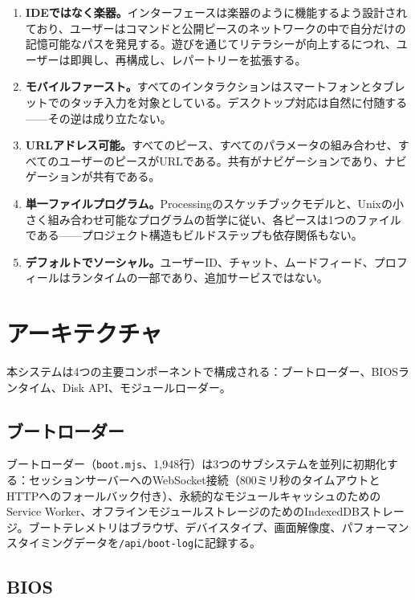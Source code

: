 \documentclass[10pt,letterpaper,twocolumn]{article}
\begin{document}
\begin{enumerate}
  \item \textbf{IDEではなく楽器。}インターフェースは楽器のように機能するよう設計されており、ユーザーはコマンドと公開ピースのネットワークの中で自分だけの記憶可能なパスを発見する。遊びを通じてリテラシーが向上するにつれ、ユーザーは即興し、再構成し、レパートリーを拡張する。
  \item \textbf{モバイルファースト。}すべてのインタラクションはスマートフォンとタブレットでのタッチ入力を対象としている。デスクトップ対応は自然に付随する——その逆は成り立たない。
  \item \textbf{URLアドレス可能。}すべてのピース、すべてのパラメータの組み合わせ、すべてのユーザーのピースがURLである。共有がナビゲーションであり、ナビゲーションが共有である。
  \item \textbf{単一ファイルプログラム。}Processingのスケッチブックモデルと、Unixの小さく組み合わせ可能なプログラムの哲学に従い、各ピースは1つのファイルである——プロジェクト構造もビルドステップも依存関係もない。
  \item \textbf{デフォルトでソーシャル。}ユーザーID、チャット、ムードフィード、プロフィールはランタイムの一部であり、追加サービスではない。
\end{enumerate}


\section{アーキテクチャ}
\label{sec:architecture}

本システムは4つの主要コンポーネントで構成される：ブートローダー、BIOSランタイム、Disk API、モジュールローダー。

\subsection{ブートローダー}

ブートローダー（\texttt{boot.mjs}、1,948行）は3つのサブシステムを並列に初期化する：セッションサーバーへのWebSocket接続（800ミリ秒のタイムアウトとHTTPへのフォールバック付き）、永続的なモジュールキャッシュのためのService Worker、オフラインモジュールストレージのためのIndexedDBストレージ。ブートテレメトリはブラウザ、デバイスタイプ、画面解像度、パフォーマンスタイミングデータを\texttt{/api/boot-log}に記録する。

\subsection{BIOS}
\end{document}
